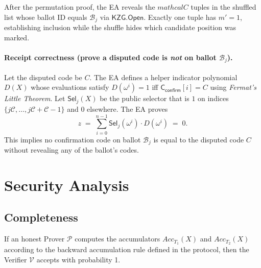 After the permutation proof, the EA reveals the $mathcal{C}$ tuples in the shuffled list whose ballot ID equals $\mathcal{B}_j$ via $\mathsf{KZG.Open}$.
Exactly one tuple has $m'=1$, establishing inclusion while the shuffle hides which candidate position was marked.

\paragraph{Receipt correctness (prove a disputed code is \emph{not} on ballot $\mathcal{B}_j$).}
Let the disputed code be $C$. The EA defines a helper indicator polynomial $D(X)$ whose evaluations satisfy
$D(\omega^i)=1$ iff $\mathsf{C}_{\mathsf{confirm}}[i]=C$ using \emph{Fermat's Little Theorem}.
Let $\mathsf{Sel}_j(X)$ be the public selector that is $1$ on indices $\{j\mathcal{C},\dots,j\mathcal{C}+\mathcal{C}-1\}$ and $0$ elsewhere.
The EA proves
\[
z \;=\; \sum_{i=0}^{n-1}\mathsf{Sel}_j(\omega^i)\cdot D(\omega^i) \;=\; 0.
\]
This implies no confirmation code on ballot $\mathcal{B}_j$ is equal to the disputed code $C$ without revealing any of the ballot’s codes.

\section{Security Analysis}

\subsection{Completeness}

\begin{theorem}[Completeness]
    If an honest Prover $\mathcal{P}$ computes the accumulators $Acc_{T_1}(X)$ and $Acc_{T_2}(X)$ according to the backward accumulation rule defined in the protocol, then the Verifier $\mathcal{V}$ accepts with probability 1.
\end{theorem}

